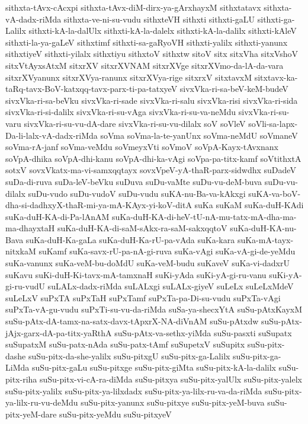 {sithxta-tAvx-cAcxpi
sithxta-tAvx-diM-dirx-ya-gArxhayxM
sithxtatavx
sithxta-vA-dadx-riMda
sithxta-ve-ni-su-vudu
sithxteVH
sithxti
sithxti-gaLU
sithxti-ga-Lalilx
sithxti-kA-la-dalUlx
sithxti-kA-la-dalelx
sithxti-kA-la-dalilx
sithxti-kAleV
sithxti-la-ya-gaLeV
sithxtimf
sithxti-sa-gaRyoVH
sithxti-yalilx
sithxti-yanunx
sithxtiyeV
sithxti-yilalx
sithxtiyu
sithxtoV
sithxtw
sitoV
sitx
sitxVha
sitxVshoV
sitxVtAyxsAtxM
sitxrXV
sitxrXVNAM
sitxrXVge
sitxrXVmo-da-lA-da-vara
sitxrXVyanunx
sitxrXVya-ranunx
sitxrXVya-rige
sitxrxV
sitxtavxM
sitxtavx-ka-taRq-tavx-BoV-katxqq-tavx-parx-ti-pa-tatxyeV
sivxVka-ri-sa-beV-keM-budeV
sivxVka-ri-sa-beVku
sivxVka-ri-sade
sivxVka-ri-salu
sivxVka-risi
sivxVka-ri-sida
sivxVka-ri-si-dalilx
sivxVka-ri-su-vAga
sivxVka-ri-su-va-neMdu
sivxVka-ri-su-varu
sivxVka-ri-su-vu-dA-dare
sivxVka-ri-su-vu-dilalx
soV
soVleV
soVli-sa-lapx-Da-li-lalx-vA-dadx-riMda
soVma
soVma-la-te-yanUnx
soVma-neMdU
soVmaneV
soVma-rA-janf
soVma-veMdu
soVmeyxVti
soVmoV
soVpA-Kayx-tAvxnanx
soVpA-dhika
soVpA-dhi-kanu
soVpA-dhi-ka-vAgi
soVpa-pa-titx-kamf
soVtithxtA
sotxV
sovxVkatx-ma-vi-samxqqtayx
sovxVpeV-yA-thaR-parx-sidwdhx
suDadeV
suDa-di-ruva
suDa-leV-beVku
suDuva
suDu-vaMte
suDu-vu-deM-buva
suDu-vu-dilalx
suDu-vudo
suDu-vudoV
suDu-vudu
suKA-nu-Ba-va-kAkxgi
suKA-va-boV-dha-si-dadhxyX-thaR-mi-ya-mA-KAyx-yi-koV-ditA
suKa
suKaM
suKa-duH-KAdi
suKa-duH-KA-di-Pa-lAnAM
suKa-duH-KA-di-heV-tU-nA-mu-tatx-mA-dha-ma-ma-dhayxtaH
suKa-duH-KA-di-saM-sAkx-ra-saM-sakxqqtoV
suKa-duH-KA-nu-Bava
suKa-duH-Ka-gaLa
suKa-duH-Ka-rU-pa-vAda
suKa-kara
suKa-mA-tayx-nitxkaM
suKamf
suKa-savx-rU-pa-nA-gi-ruva
suKa-vAgi
suKa-vA-gi-de-yeMdu
suKa-vanunx
suKa-veM-bu-doMdU
suKa-veM-budu
suKaveV
suKa-vi-dadxrU
suKavu
suKi-duH-Ki-tavx-mA-tamxnaH
suKi-yAda
suKi-yA-gi-ru-vanu
suKi-yA-gi-ru-vudU
suLALx-dadx-riMda
suLALxgi
suLALx-giyeV
suLeLx
suLeLxMdeV
suLeLxV
suPxTA
suPxTaH
suPxTamf
suPxTa-pa-Di-su-vudu
suPxTa-vAgi
suPxTa-vA-gu-vudu
suPxTi-su-vu-da-riMda
suSa-ya-shecxYtA
suSu-pAtxKayxM
suSu-pAtx-dA-tamx-na-satx-davx-tApxrX-NA-diVnAM
suSu-pAtxdw
suSu-pAtx-jAjx-garx-dA-pa-titx-yaRthA
suSu-pAtx-va-sethx-yiMda
suSu-pasxti
suSupatx
suSupatxM
suSu-patx-nAda
suSu-patx-tAmf
suSupetxV
suSupitx
suSu-pitx-dashe
suSu-pitx-da-she-yalilx
suSu-pitxgU
suSu-pitx-ga-Lalilx
suSu-pitx-ga-LiMda
suSu-pitx-gaLu
suSu-pitxge
suSu-pitx-giMta
suSu-pitx-kA-la-dalilx
suSu-pitx-riha
suSu-pitx-vi-cA-ra-diMda
suSu-pitxya
suSu-pitx-yalUlx
suSu-pitx-yalelx
suSu-pitx-yalilx
suSu-pitx-ya-lilxdadx
suSu-pitx-ya-lilx-ru-va-da-riMda
suSu-pitx-ya-lilx-ru-vu-deMdu
suSu-pitx-yanunx
suSu-pitxye
suSu-pitx-yeM-buva
suSu-pitx-yeM-dare
suSu-pitx-yeMdu
suSu-pitxyeV
}

